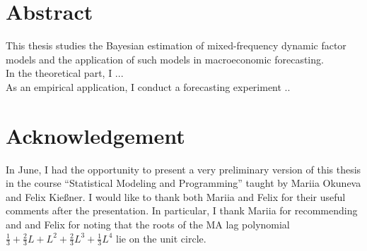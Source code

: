\section*{Abstract}

This thesis studies the Bayesian estimation of mixed-frequency dynamic factor models and the application of such models in macroeconomic forecasting. \\
In the theoretical part, I ... \\
As an empirical application, I conduct a forecasting experiment ..


\vspace{2cm}
\section*{Acknowledgement}

In June, I had the opportunity to present a very preliminary version of this thesis in the course ``Statistical Modeling and Programming'' taught by Mariia Okuneva and Felix Kießner. I would like to thank both Mariia and Felix for their useful comments after the presentation. In particular, I thank Mariia for recommending \citet{ZhouEtal2014} and \citet{Thorsrud2016a, Thorsrud2016b} and Felix for noting that the roots of the MA lag polynomial $\frac{1}{3} + \frac{2}{3} L + L^2 + \frac{2}{3}L^3 + \frac{1}{3}L^4$ lie on the unit circle.